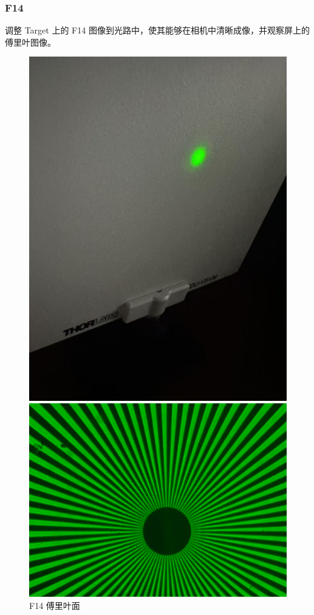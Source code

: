 \documentclass{ctexart}
\begin{document}
\subsubsection{F14}
调整 Target 上的 F14 图像到光路中，使其能够在相机中清晰成像，并观察屏上的傅里叶图像。
\begin{figure}[H]
  \centering
  \begin{minipage}[b]{0.2\textwidth}
    \centering
    \includegraphics[width=\textwidth]{pictures/微信图片_20241017164902.jpg}
    \caption{F14 傅里叶面}
  \end{minipage}
  \hspace{0.1\textwidth} %
  \begin{minipage}[b]{0.3\textwidth}
    \centering
    \includegraphics[width=\textwidth]{pictures/F14-nomask.png}

\end{minipage}
\end{figure}
\end{document}
